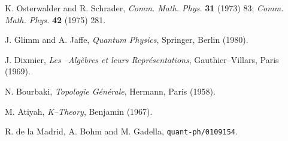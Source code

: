 \documentclass[a4paper,a4paper]{article}
\begin{document}
\begin{thebibliography}{99}
K. Osterwalder and R. Schrader, {\it Comm. Math. Phys.} {\bf 31} (1973) 83;
{\it Comm. Math. Phys.} {\bf 42} (1975) 281.

J. Glimm and A. Jaffe, {\it Quantum Physics}, Springer, Berlin (1980).

J. Dixmier, {\it Les \coordHE{}--Alg\`ebres et leurs Repr\'esentations}, 
Gauthier--Villars, Paris (1969).

N. Bourbaki, {\it Topologie G\'en\'erale}, Hermann, Paris (1958).

M. Atiyah, {\it K--Theory}, Benjamin (1967).

R. de la Madrid, A. Bohm and M. Gadella, {\tt quant-ph/0109154}.




\end{thebibliography}
\end{document}
